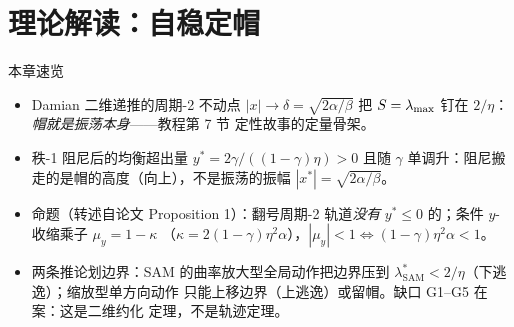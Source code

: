 
\section{理论解读：自稳定帽}\label{sec:ch09}

\begin{keybox}{本章速览}
\begin{itemize}
  \item Damian 二维递推的周期-2 不动点 $|x|{\to}\delta=\sqrt{2\alpha/\beta}$
        把 $S=\lambda_{\max}$ 钉在 $2/\eta$：\emph{帽就是振荡本身}——教程第 7 节
        定性故事的定量骨架。
  \item 秩-1 阻尼后的均衡超出量 $y^{*}=2\gamma/((1-\gamma)\eta)>0$ 且随
        $\gamma$ 单调升：阻尼搬走的是帽的高度（向上），不是振荡的振幅
        $|x^{*}|=\sqrt{2\alpha/\beta}$。
  \item 命题（转述自论文 Proposition 1）：翻号周期-2 轨道\emph{没有}
        $y^{*}\le0$ 的；条件 $y$-收缩乘子 $\mu_y=1-\kappa$
        （$\kappa=2(1-\gamma)\eta^2\alpha$），$|\mu_y|<1\iff
        (1-\gamma)\eta^2\alpha<1$。
  \item 两条推论划边界：SAM 的曲率放大型全局动作把边界压到
        $\lambda^{*}_{\mathrm{SAM}}<2/\eta$（下逃逸）；缩放型单方向动作
        只能上移边界（上逃逸）或留帽。缺口 G1--G5 在案：这是二维约化
        定理，不是轨迹定理。
\end{itemize}
\end{keybox}

